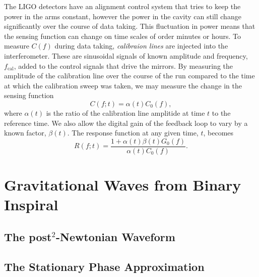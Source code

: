 The LIGO detectors have an alignment control system that tries to keep the
power in the arms constant, however the power in the cavity can still change
significantly over the course of data taking. This fluctuation in power means
that the sensing function can change on time scales of order minutes or hours.
To measure $C(f)$ during data taking, \emph{calibraion lines} are injected
into the interferometer. These are sinusoidal signals of known amplitude and
frequency, $f_\mathrm{cal}$, added to the control signals that drive the
mirrors.  By measuring the amplitude of the calibration line over the course
of the run compared to the time at which the calibration sweep was taken, we
may measure the change in the sensing function
\begin{equation}
C(f;t) = \alpha(t) C_0(f),
\end{equation}
where $\alpha(t)$ is the ratio of the calibration line amplitide at time $t$
to the reference time. We also allow the digital gain of the feedback loop to
vary by a known factor, $\beta(t)$. The response function at any given time,
$t$, becomes
\begin{equation}
R(f;t) = \frac{1 + \alpha(t)\beta(t)G_0(f)}{\alpha(t)C_0(f)}.
\end{equation}

\section{Gravitational Waves from Binary Inspiral}
\label{s:inspiralgw}

\subsection{The post$^2$-Newtonian Waveform}

\subsection{The Stationary Phase Approximation}
\label{ss:stationaryphase}

